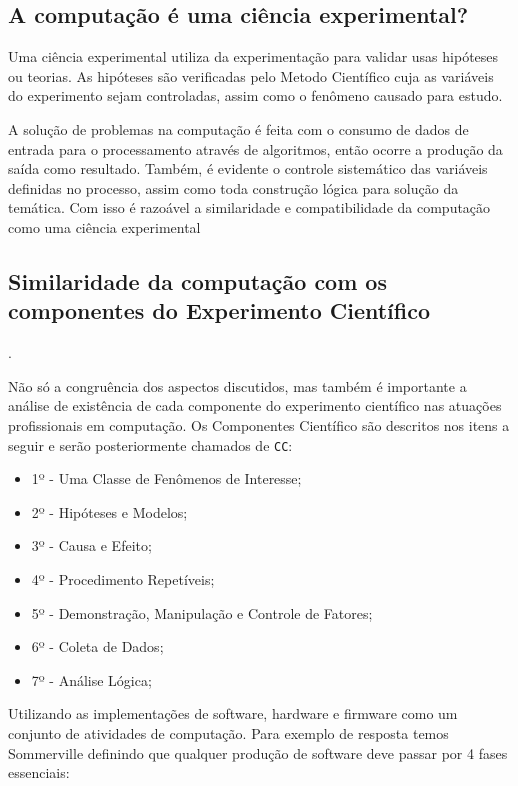 \subsection{A computação é uma ciência experimental?}

Uma ciência experimental utiliza da experimentação para validar usas hipóteses ou teorias. As hipóteses são verificadas pelo \gls{Metodo} Científico cuja as variáveis do experimento sejam controladas, assim como o fenômeno causado para estudo.

A solução de problemas na computação é feita com o consumo de dados de entrada para o processamento através de algoritmos, então ocorre a produção da saída como resultado. Também, é evidente o controle sistemático das variáveis definidas no processo, assim como toda construção lógica para solução da temática. Com isso é razoável a similaridade e compatibilidade da computação como uma ciência experimental

\subsection{Similaridade da computação com os componentes do Experimento Científico}.

Não só a congruência dos aspectos discutidos, mas também é importante a análise de existência de cada componente do experimento científico nas atuações profissionais em computação. Os Componentes Científico são descritos nos itens a seguir e serão posteriormente chamados de \texttt{CC}:

\begin{itemize}
    \item 1º - Uma Classe de Fenômenos de Interesse;
    \item 2º - Hipóteses e Modelos;
    \item 3º - Causa e Efeito;
    \item 4º - Procedimento Repetíveis;
    \item 5º - Demonstração, Manipulação e Controle de Fatores;
    \item 6º - Coleta de Dados;
    \item 7º - Análise Lógica;
\end{itemize}

Utilizando as implementações de software, hardware e firmware como um conjunto de atividades de computação. Para exemplo de resposta temos Sommerville definindo que qualquer produção de software deve passar por 4 fases essenciais: 

